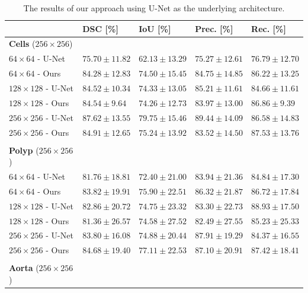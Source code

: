\begin{table}[H]
\caption{The results of our approach using U-Net as the underlying architecture.\label{tab:seg-then-seg-results}}
		\begin{tabularx}{\textwidth}{lCCCC}
			& \textbf{DSC [\%]} & \textbf{IoU [\%]} & \textbf{Prec. [\%]} & \textbf{Rec. [\%]}\\
			\toprule
\toprule
\textbf{Cells} ($256 \times 256$) & & & & \\
\midrule
$64 \times 64$ - U-Net & $75.70 \pm 11.82$ & $62.13 \pm 13.29$ & $75.27 \pm 12.61$ & $76.79 \pm 12.70$ \\
$64 \times 64$ - Ours & $84.28 \pm 12.83$ & $74.50 \pm 15.45$ & $84.75 \pm 14.85$ & $86.22 \pm 13.25$ \\
\midrule
$128 \times 128$ - U-Net & $84.52 \pm 10.34$ & $74.33 \pm 13.05$ & $85.21 \pm 11.61$ & $84.66 \pm 11.61$ \\
$128 \times 128$ - Ours & $84.54 \pm 9.64$ & $74.26 \pm 12.73$ & $83.97 \pm 13.00$ & $86.86 \pm 9.39$ \\
\midrule
$256 \times 256$ - U-Net & $87.62 \pm 13.55$ & $79.75 \pm 15.46$ & $89.44 \pm 14.09$ & $86.58 \pm 14.83$ \\
$256 \times 256$ - Ours & $84.91 \pm 12.65$ & $75.24 \pm 13.92$ & $83.52 \pm 14.50$ & $87.53 \pm 13.76$ \\
\bottomrule \\
\toprule
\textbf{Polyp} ($256 \times 256$) & & & & \\
\midrule
$64 \times 64$ - U-Net & $81.76 \pm 18.81$ & $72.40 \pm 21.00$ & $83.94 \pm 21.36$ & $84.84 \pm 17.30$ \\
$64 \times 64$ - Ours & $83.82 \pm 19.91$ & $75.90 \pm 22.51$ & $86.32 \pm 21.87$ & $86.72 \pm 17.84$ \\
\midrule
$128 \times 128$ - U-Net & $82.86 \pm 20.72$ & $74.75 \pm 23.32$ & $83.30 \pm 22.73$ & $88.93 \pm 17.50$ \\
$128 \times 128$ - Ours & $81.36 \pm 26.57$ & $74.58 \pm 27.52$ & $82.49 \pm 27.55$ & $85.23 \pm 25.33$ \\
\midrule
$256 \times 256$ - U-Net & $83.80 \pm 16.08$ & $74.88 \pm 20.44$ & $87.91 \pm 19.29$ & $84.37 \pm 16.55$ \\
$256 \times 256$ - Ours & $84.68 \pm 19.40$ & $77.11 \pm 22.53$ & $87.10 \pm 20.91$ & $87.42 \pm 18.41$ \\
\bottomrule \\
\toprule
\textbf{Aorta} ($256 \times 256$) & & & & \\

\end{tabularx}
\end{table}
